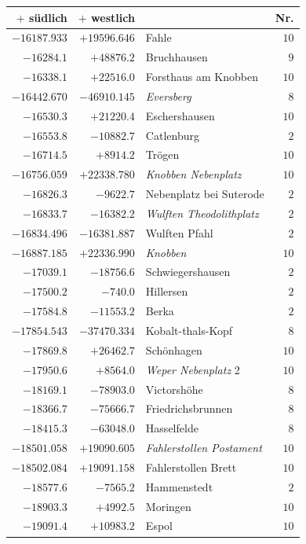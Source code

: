 \begin{center}\begingroup\fontsize{8}{9}\selectfont
\setlength{\tabcolsep}{4pt}
\begin{tabular}{r|r|p{170pt}|r}\hline
\(+\) südlich&\(+\) westlich&&Nr.\\\hline
\(-16187.933\)&\(+19596.646\)&Fahle&\(10\)\\
\(-16284.1\)&\(+48876.2\)&Bruchhausen&\(9\)\\
\(-16338.1\)&\(+22516.0\)&Forsthaus am Knobben&\(10\)\\
\(-16442.670\)&\(-46910.145\)&\textit{Eversberg}&\(8\)\\
\(-16530.3\)&\(+21220.4\)&Eschershausen&\(10\)\\
\(-16553.8\)&\(-10882.7\)&Catlenburg&\(2\)\\
\(-16714.5\)&\(+8914.2\)&Trögen&\(10\)\\
\(-16756.059\)&\(+22338.780\)&\textit{Knobben Nebenplatz}&\(10\)\\
\(-16826.3\)&\(-9622.7\)&Nebenplatz bei Suterode&\(2\)\\
\(-16833.7\)&\(-16382.2\)&\textit{Wulften Theodolithplatz}&\(2\)\\
\(-16834.496\)&\(-16381.887\)&Wulften Pfahl&\(2\)\\
\(-16887.185\)&\(+22336.990\)&\textit{Knobben}&\(10\)\\
\(-17039.1\)&\(-18756.6\)&Schwiegershausen&\(2\)\\
\(-17500.2\)&\(-740.0\)&Hillersen&\(2\)\\
\(-17584.8\)&\(-11553.2\)&Berka&\(2\)\\
\(-17854.543\)&\(-37470.334\)&Kobalt-thals-Kopf&\(8\)\\
\(-17869.8\)&\(+26462.7\)&Schönhagen&\(10\)\\
\(-17950.6\)&\(+8564.0\)&\textit{Weper Nebenplatz} 2&\(10\)\\
\(-18169.1\)&\(-78903.0\)&Victorshöhe&\(8\)\\
\(-18366.7\)&\(-75666.7\)&Friedrichsbrunnen&\(8\)\\
\(-18415.3\)&\(-63048.0\)&Hasselfelde&\(8\)\\
\(-18501.058\)&\(+19090.605\)&\textit{Fahlerstollen Postament}&\(10\)\\
\(-18502.084\)&\(+19091.158\)&Fahlerstollen Brett&\(10\)\\
\(-18577.6\)&\(-7565.2\)&Hammenstedt&\(2\)\\
\(-18903.3\)&\(+4992.5\)&Moringen&\(10\)\\
\(-19091.4\)&\(+10983.2\)&Espol&\(10\)\\

\end{tabular}
\end{center}
